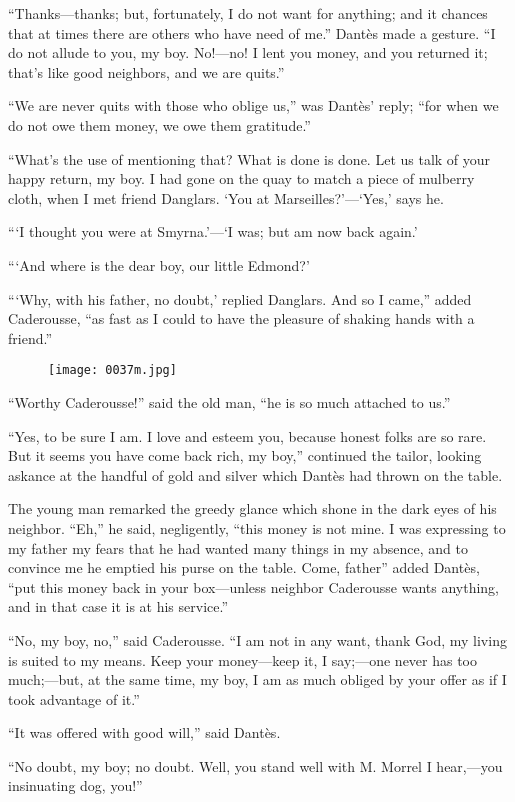 “Thanks—thanks; but, fortunately, I do not want for anything; and it
chances that at times there are others who have need of me.” Dantès
made a gesture. “I do not allude to you, my boy. No!—no! I lent you
money, and you returned it; that’s like good neighbors, and we are
quits.”

“We are never quits with those who oblige us,” was Dantès’ reply; “for
when we do not owe them money, we owe them gratitude.”

“What’s the use of mentioning that? What is done is done. Let us talk
of your happy return, my boy. I had gone on the quay to match a piece
of mulberry cloth, when I met friend Danglars. ‘You at
Marseilles?’—‘Yes,’ says he.

“‘I thought you were at Smyrna.’—‘I was; but am now back again.’

“‘And where is the dear boy, our little Edmond?’

“‘Why, with his father, no doubt,’ replied Danglars. And so I came,”
added Caderousse, “as fast as I could to have the pleasure of shaking
hands with a friend.”

\begin{figure}[ht]
\texttt{[image: 0037m.jpg]}
\end{figure}

“Worthy Caderousse!” said the old man, “he is so much attached to us.”

“Yes, to be sure I am. I love and esteem you, because honest folks are
so rare. But it seems you have come back rich, my boy,” continued the
tailor, looking askance at the handful of gold and silver which Dantès
had thrown on the table.

The young man remarked the greedy glance which shone in the dark eyes
of his neighbor. “Eh,” he said, negligently, “this money is not mine. I
was expressing to my father my fears that he had wanted many things in
my absence, and to convince me he emptied his purse on the table. Come,
father” added Dantès, “put this money back in your box—unless neighbor
Caderousse wants anything, and in that case it is at his service.”

“No, my boy, no,” said Caderousse. “I am not in any want, thank God, my
living is suited to my means. Keep your money—keep it, I say;—one never
has too much;—but, at the same time, my boy, I am as much obliged by
your offer as if I took advantage of it.”

“It was offered with good will,” said Dantès.

“No doubt, my boy; no doubt. Well, you stand well with M. Morrel I
hear,—you insinuating dog, you!”

